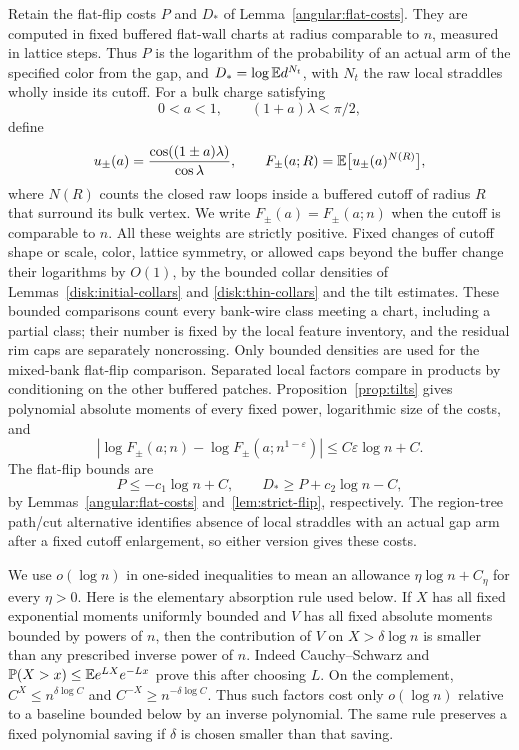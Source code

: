 Retain the flat-flip costs \(P\) and \(D_*\) of
Lemma~\ref{angular:flat-costs}. They are computed in fixed buffered
flat-wall charts at radius comparable to \(n\), measured in lattice
steps. Thus \(P\) is the logarithm of the probability of an actual
arm of the specified color from the gap, and
\(D_*=\log\mathbb E d^{N_t}\), with \(N_t\) the raw local straddles
wholly inside its cutoff. For a bulk charge satisfying
\[
 0<a<1,\qquad (1+a)\lambda<\pi/2,
\]
define
\begin{equation}\label{physical:bulk-costs}
 u_\pm(a)=\frac{\cos((1\pm a)\lambda)}{\cos\lambda},\qquad
 F_\pm(a;R)=\mathbb E\bigl[u_\pm(a)^{N(R)}\bigr],
\end{equation}
where \(N(R)\) counts the closed raw loops inside a buffered cutoff
of radius \(R\) that surround its bulk vertex. We write
\(F_\pm(a)=F_\pm(a;n)\) when the cutoff is comparable to \(n\).
All these weights are strictly positive. Fixed changes of cutoff
shape or scale, color, lattice symmetry, or allowed caps beyond the
buffer change their logarithms by \(O(1)\), by the bounded collar
densities of Lemmas~\ref{disk:initial-collars} and
\ref{disk:thin-collars} and the tilt estimates.  These bounded comparisons
count every bank-wire class meeting a chart, including a partial class;
their number is fixed by the local feature inventory, and the residual
rim caps are separately noncrossing.  Only bounded densities are used
for the mixed-bank flat-flip comparison. Separated local factors
compare in products by conditioning
on the other buffered patches. Proposition~\ref{prop:tilts} gives
polynomial absolute moments of every fixed power, logarithmic size
of the costs, and
\begin{equation}\label{physical:cutoff-increment}
 \left|\log F_\pm(a;n)-\log F_\pm(a;n^{1-\varepsilon})\right|
 \le C\varepsilon\log n+C.
\end{equation}
The flat-flip bounds are
\begin{equation}\label{physical:flip-costs}
 P\le-c_1\log n+C,\qquad
 D_*\ge P+c_2\log n-C,
\end{equation}
by Lemmas~\ref{angular:flat-costs} and~\ref{lem:strict-flip},
respectively. The region-tree path/cut alternative
identifies absence of local straddles with an actual gap arm after
a fixed cutoff enlargement, so either version gives these costs.

We use \(o(\log n)\) in one-sided inequalities to mean an allowance
\(\eta\log n+C_\eta\) for every \(\eta>0\). Here is the
elementary absorption rule used below. If \(X\) has all fixed
exponential moments uniformly bounded and \(V\) has all fixed
absolute moments bounded by powers of \(n\), then the contribution
of \(V\) on \(X>\delta\log n\) is smaller than any prescribed
inverse power of \(n\). Indeed Cauchy--Schwarz and
\(\mathbb P(X>x)\le \mathbb E e^{LX}e^{-Lx}\) prove this after choosing
\(L\). On the complement, \(C^X\le n^{\delta\log C}\) and
\(C^{-X}\ge n^{-\delta\log C}\). Thus such factors cost only
\(o(\log n)\) relative to a baseline bounded below by an inverse
polynomial. The same rule preserves a fixed polynomial saving if
\(\delta\) is chosen smaller than that saving.

